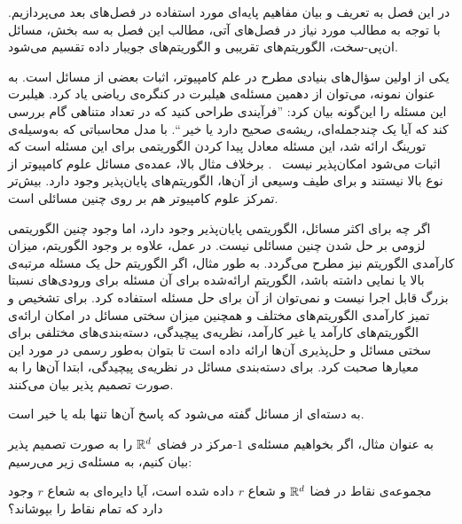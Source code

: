

در این فصل به تعریف و بیان مفاهیم پایه‌ای مورد استفاده در فصل‌های بعد می‌پردازیم.
با توجه به مطالب مورد نیاز در فصل‌های آتی، مطالب این فصل به سه بخش، مسائل ان‌پی-سخت، الگوریتم‌های تقریبی و الگوریتم‌های جویبار داده تقسیم می‌شود.


یکی از اولین سؤال‌های بنیادی مطرح در علم کامپیوتر، اثبات  بعضی از مسائل است.
به عنوان نمونه، می‌توان از دهمین مسئله‌ی هیلبرت در کنگره‌ی ریاضی یاد کرد.
هیلبرت این مسئله را این‌گونه بیان کرد:‌ ''فرآیندی طراحی کنید که در تعداد متناهی گام بررسی کند که آیا یک چندجمله‌ای، ریشه‌ی صحیح دارد یا خیر ``. 
با مدل محاسباتی که به‌وسیله‌ی تورینگ ارائه شد، این مسئله معادل پیدا کردن الگوریتمی برای این مسئله است که اثبات می‌شود امکان‌پذیر نیست ~.
برخلاف مثال بالا، عمده‌ی مسائل علوم کامپیوتر از نوع بالا نیستند و برای طیف وسیعی از آن‌ها، الگوریتم‌های پایان‌پذیر وجود دارد.
بیش‌تر تمرکز علوم کامپیوتر هم بر روی چنین مسائلی است.

اگر چه برای اکثر مسائل، الگوریتمی پایان‌پذیر وجود دارد، اما وجود چنین الگوریتمی لزومی بر حل شدن چنین مسائلی نیست.
در عمل، علاوه بر وجود الگوریتم، میزان کارآمدی الگوریتم نیز مطرح می‌گردد.
به طور مثال، اگر الگوریتم حل یک مسئله مرتبه‌ی بالا یا نمایی داشته باشد، الگوریتم ارائه‌شده برای آن مسئله برای ورودی‌های نسبتا بزرگ قابل اجرا نیست و نمی‌توان از آن برای حل مسئله استفاده کرد.
برای تشخیص و تمیز کارآمدی الگوریتم‌های مختلف و همچنین میزان سختی مسائل در امکان ارائه‌ی الگوریتم‌های کارآمد یا غیر کارآمد، نظریه‌ی پیچیدگی، دسته‌بندی‌های مختلفی برای سختی مسائل و حل‌پذیری آن‌ها ارائه داده است تا بتوان به‌طور رسمی در مورد این معیارها صحبت کرد.
برای دسته‌بندی مسائل در نظریه‌ی پیچیدگی، ابتدا آن‌ها را به صورت تصمیم پذیر بیان می‌کنند.


 به دسته‌ای از مسائل گفته می‌شود که پاسخ آن‌ها تنها بله یا خیر است.


به عنوان مثال، اگر بخواهیم مسئله‌ی $1$-مرکز در فضای $\mathbb{R}^d$ را به صورت تصمیم پذیر بیان کنیم، به مسئله‌ی زیر می‌رسیم:


 مجموعه‌ی نقاط در فضا $\mathbb{R}^d$ و شعاع $r$ داده شده است، آیا دایره‌ای به شعاع $r$ وجود دارد که تمام نقاط را بپوشاند؟

